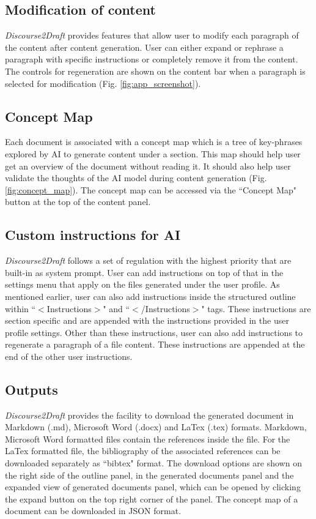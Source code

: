 \documentclass[utf8]{FrontiersinHarvard} %
\newcommand{\appname}{\emph{Discourse2Draft}}
\begin{document}
\subsection{Modification of content}

\appname{} provides features that allow user to modify each paragraph of the content after content generation. User can either expand or rephrase a paragraph with specific instructions or completely remove it from the content. The controls for regeneration are shown on the content bar when a paragraph is selected for modification (Fig. \ref{fig:app_screenshot}).

\subsection{Concept Map}

Each document is associated with a concept map which is a tree of key-phrases explored by AI to generate content under a section. This map should help user get an overview of the document without reading it. It should also help user validate the thoughts of the AI model during content generation (Fig. \ref{fig:concept_map}). The concept map can be accessed via the ``Concept Map" button at the top of the content panel.

\subsection{Custom instructions for AI}

\appname{} follows a set of regulation with the highest priority that are built-in as system prompt. User can add instructions on top of that in the settings menu that apply on the files generated under the user profile. As mentioned earlier, user can also add instructions inside the structured outline within ``$<$Instructions$>$" and ``$<$/Instructions$>$" tags. These instructions are section specific and are appended with the instructions provided in the user profile settings. Other than these instructions, user can also add instructions to regenerate a paragraph of a file content. These instructions are appended at the end of the other user instructions.  

\subsection{Outputs}
\appname{} provides the facility to download the generated document in Markdown (.md), Microsoft Word (.docx) and LaTex (.tex) formats. Markdown, Microsoft Word formatted files contain the references inside the file. For the LaTex formatted file, the bibliography of the associated references can be downloaded separately as ``bibtex" format. The download options are shown on the right side of the outline panel, in the generated documents panel and the expanded view of generated documents panel, which can be opened by clicking the expand button on the top right corner of the panel. The concept map of a document can be downloaded in JSON format.
\end{document}
